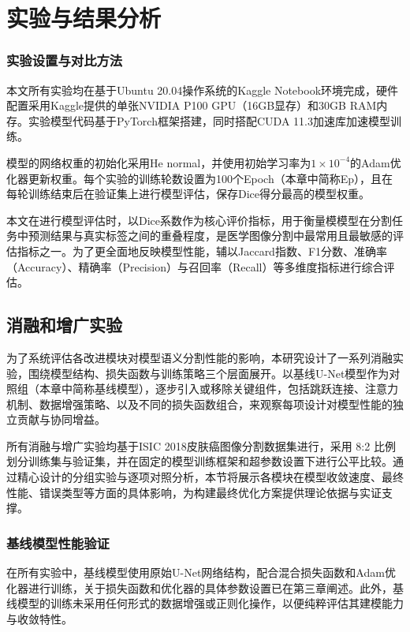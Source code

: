 \section{实验与结果分析}

\subsubsection{实验设置与对比方法}

本文所有实验均在基于Ubuntu 20.04操作系统的Kaggle Notebook环境完成，硬件配置采用Kaggle提供的单张NVIDIA P100 GPU（16GB显存）和30GB RAM内存。实验模型代码基于PyTorch框架搭建，同时搭配CUDA 11.3加速库加速模型训练。

模型的网络权重的初始化采用He normal，并使用初始学习率为$1 \times 10^{-4}$的Adam优化器更新权重。每个实验的训练轮数设置为100个Epoch（本章中简称Ep），且在每轮训练结束后在验证集上进行模型评估，保存Dice得分最高的模型权重。

本文在进行模型评估时，以Dice系数作为核心评价指标，用于衡量模模型在分割任务中预测结果与真实标签之间的重叠程度，是医学图像分割中最常用且最敏感的评估指标之一。为了更全面地反映模型性能，辅以Jaccard指数、F1分数、准确率（Accuracy）、精确率（Precision）与召回率（Recall）等多维度指标进行综合评估。

\subsection{消融和增广实验}

为了系统评估各改进模块对模型语义分割性能的影响，本研究设计了一系列消融实验，围绕模型结构、损失函数与训练策略三个层面展开。以基线U-Net模型作为对照组（本章中简称基线模型），逐步引入或移除关键组件，包括跳跃连接、注意力机制、数据增强策略、以及不同的损失函数组合，来观察每项设计对模型性能的独立贡献与协同增益。

所有消融与增广实验均基于ISIC 2018皮肤癌图像分割数据集进行，采用 8:2 比例划分训练集与验证集，并在固定的模型训练框架和超参数设置下进行公平比较。通过精心设计的分组实验与逐项对照分析，本节将展示各模块在模型收敛速度、最终性能、错误类型等方面的具体影响，为构建最终优化方案提供理论依据与实证支撑。

\subsubsection{基线模型性能验证}

在所有实验中，基线模型使用原始U-Net网络结构，配合混合损失函数和Adam优化器进行训练，关于损失函数和优化器的具体参数设置已在第三章阐述。此外，基线模型的训练未采用任何形式的数据增强或正则化操作，以便纯粹评估其建模能力与收敛特性。

